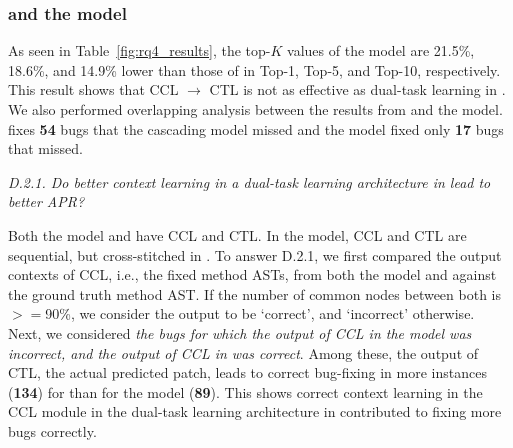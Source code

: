 

\subsubsection{{\bf {\tool} and the  model}}

As seen in Table~\ref{fig:rq4_results}, the top-$K$ values of the
 model are 21.5\%, 18.6\%, and 14.9\% lower than those
of {\tool} in Top-1, Top-5, and Top-10, respectively. This result
shows that CCL $\rightarrow$ CTL is not as effective as dual-task
learning in {\tool}.
%
%
We also performed overlapping analysis between the results from
{\tool} and the  model. {\tool} fixes {\bf 54} bugs
that the cascading model missed and the  model fixed
only {\bf 17} bugs that {\tool} missed.

{\em D.2.1. Do better context learning in a dual-task learning
  architecture in {\tool} lead to better APR?}

Both the  model and {\tool} have CCL and CTL. In the
 model, CCL and CTL are sequential, but cross-stitched
in {\tool}. To answer D.2.1, we first compared the output contexts of
CCL, i.e., the fixed method ASTs, from both the  model
and {\tool} against the ground truth method AST. If the number of
common nodes between both is$>=$90\%, we consider the output to be
`correct', and `incorrect' otherwise. Next, we considered {\em the
  bugs for which the output of CCL in the  model was
  incorrect, and the output of CCL in {\tool} was correct}. Among
these, the output of CTL, the actual predicted patch, leads to correct
bug-fixing in more instances ({\bf 134}) for {\tool} than for the
 model ({\bf 89}). This shows correct context learning
in the CCL module in the dual-task learning architecture in {\tool}
contributed to fixing more bugs correctly.

